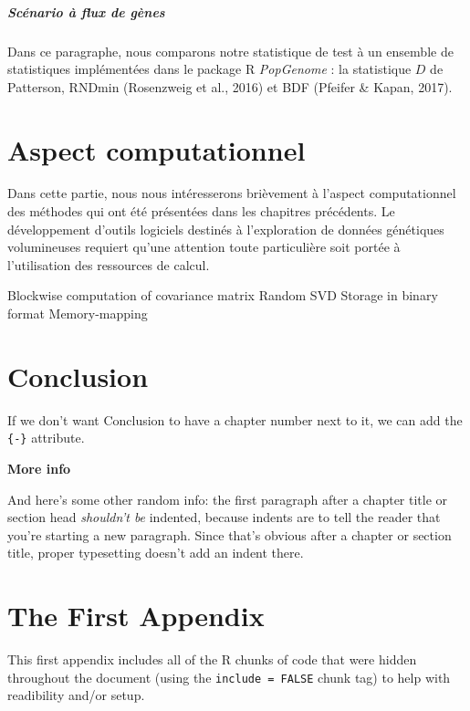 \documentclass[12pt,twoside]{reedthesis}
\begin{document}
  \paragraph{Scénario à flux de gènes}\label{scenario-a-flux-de-genes-1}
  
  Dans ce paragraphe, nous comparons notre statistique de test à un
  ensemble de statistiques implémentées dans le package R \emph{PopGenome}
  : la statistique \(D\) de Patterson, RNDmin (Rosenzweig et al., 2016) et
  BDF (Pfeifer \& Kapan, 2017).
  
  \chapter{Aspect computationnel}\label{aspect-computationnel}
  
  Dans cette partie, nous nous intéresserons brièvement à l'aspect
  computationnel des méthodes qui ont été présentées dans les chapitres
  précédents. Le développement d'outils logiciels destinés à l'exploration
  de données génétiques volumineuses requiert qu'une attention toute
  particulière soit portée à l'utilisation des ressources de calcul.
  
  Blockwise computation of covariance matrix Random SVD Storage in binary
  format Memory-mapping
  
  \chapter*{Conclusion}\label{conclusion}
  
  If we don't want Conclusion to have a chapter number next to it, we can
  add the \texttt{\{-\}} attribute.
  
  \textbf{More info}
  
  And here's some other random info: the first paragraph after a chapter
  title or section head \emph{shouldn't be} indented, because indents are
  to tell the reader that you're starting a new paragraph. Since that's
  obvious after a chapter or section title, proper typesetting doesn't add
  an indent there.
  
  \appendix
  
  \chapter{The First Appendix}\label{the-first-appendix}
  
  This first appendix includes all of the R chunks of code that were
  hidden throughout the document (using the \texttt{include\ =\ FALSE}
  chunk tag) to help with readibility and/or setup.
  
\end{document}
